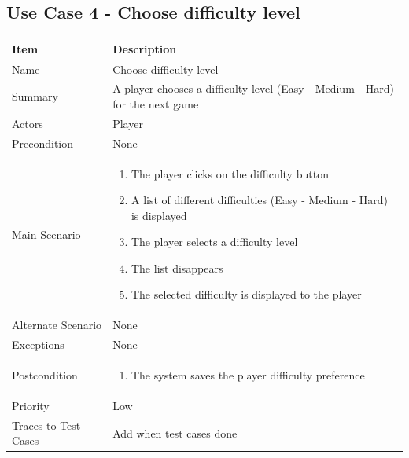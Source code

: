 \documentclass[12pt]{article}
\begin{document}
\newpage


\subsection{Use Case 4 - Choose difficulty level} 

\begin{center}
\setlength{\tabcolsep}{18pt}
\renewcommand{\arraystretch}{1.3}
\begin{tabular}{ |p{3.4cm}|p{10cm}| }
    \hline
   \textbf{Item} & \textbf{Description} \\
    \hline
    Name & Choose difficulty level \\
    \hline
    Summary & A player chooses a difficulty level (Easy - Medium - Hard) for the next game \\
    \hline
    Actors & Player \\
    \hline
    Precondition & 
    None \\
    \hline
    Main Scenario &     
    \vspace*{-0.1in}
    \begin{enumerate}[leftmargin=0.2in]
        \item The player clicks on the difficulty button
        \item A list of different difficulties (Easy - Medium - Hard) is displayed
        \item The player selects a difficulty level 
        \item The list disappears
        \item The selected difficulty is displayed to the player
    \end{enumerate}  \\
    \hline
    Alternate Scenario & None \\
    \hline
    Exceptions &  None\\
    \hline
    Postcondition & 
    \vspace*{-0.1in}
    \begin{enumerate}[leftmargin=0.2in]
        \item The system saves the player difficulty preference
    \end{enumerate}  \\
    \hline
    Priority & Low  \\
    \hline
    \small{Traces to Test Cases} & Add when test cases done  \\
    \hline
\end{tabular}
\end{center}
\end{document}
